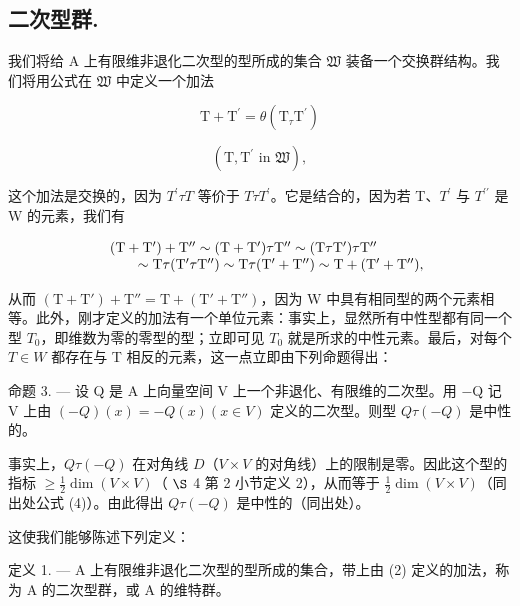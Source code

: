 \subsection{二次型群.}

  我们将给 A 上有限维非退化二次型的型所成的集合 \(\mathfrak{W}\) 装备一个交换群结构。我们将用公式在 \(\mathfrak{W}\) 中定义一个加法

\[
\mathrm{T} + \mathrm{T} ^ {\prime} = \theta (\mathrm{T} _ {\tau} \mathrm{T} ^ {\prime})\tag{2}
\]

\[
(\mathrm{T}, \mathrm{T} ^ {\prime} \text {   in   } \mathfrak {W}),
\]

  这个加法是交换的，因为 \(T^{\prime} \tau T\) 等价于 \(T \tau T^{\prime}\)。它是结合的，因为若 T、\(T^{\prime}\) 与 \(T^{\prime\prime}\) 是 W 的元素，我们有

\[
\begin{array}{r l} & (\mathrm{T} + \mathrm{T} ^ {\prime}) + \mathrm{T} ^ {\prime \prime} \sim (\mathrm{T} + \mathrm{T} ^ {\prime}) \tau \mathrm{T} ^ {\prime \prime} \sim (\mathrm{T} \tau \mathrm{T} ^ {\prime}) \tau \mathrm{T} ^ {\prime \prime} \\ & \qquad \sim \mathrm{T} \tau (\mathrm{T} ^ {\prime} \tau \mathrm{T} ^ {\prime \prime}) \sim \mathrm{T} \tau (\mathrm{T} ^ {\prime} + \mathrm{T} ^ {\prime \prime}) \sim \mathrm{T} + (\mathrm{T} ^ {\prime} + \mathrm{T} ^ {\prime \prime}), \end{array}
\]

从而 \((\mathrm{T} + \mathrm{T}' ) + \mathrm{T}'' = \mathrm{T} + (\mathrm{T}' + \mathrm{T}'' )\)，因为 W 中具有相同型的两个元素相等。此外，刚才定义的加法有一个单位元素：事实上，显然所有中性型都有同一个型 \(T_{0}\)，即维数为零的零型的型；立即可见 \(T_{0}\) 就是所求的中性元素。最后，对每个 \(T \in W\) 都存在与 T 相反的元素，这一点立即由下列命题得出：

命题 3. — 设 Q 是 A 上向量空间 V 上一个非退化、有限维的二次型。用 −Q 记 V 上由 \((-Q)(x) = -Q(x) (x \in V)\) 定义的二次型。则型 \(Q \tau (-Q)\) 是中性的。

  事实上，\(Q \tau (-Q)\) 在对角线 \(D\)（\(V \times V\) 的对角线）上的限制是零。因此这个型的指标 \(\geqslant\frac{1}{2}\dim(V\times V)\)（ \(\S\) 4 第 2 小节定义 2），从而等于 \(\frac{1}{2}\dim(V\times V)\)（同出处公式 (4)）。由此得出 \(Q\tau(-Q)\) 是中性的（同出处）。

  这使我们能够陈述下列定义：

定义 1. --- A 上有限维非退化二次型的型所成的集合，带上由 (2) 定义的加法，称为 A 的二次型群，或 A 的维特群。

